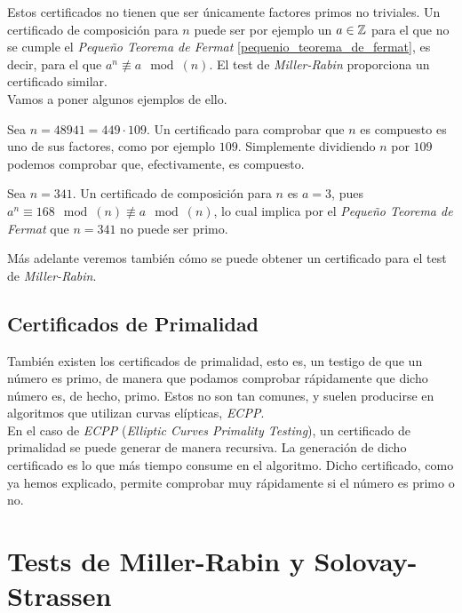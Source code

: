 Estos certificados no tienen que ser únicamente factores primos no triviales. Un certificado de composición para $n$ puede ser por ejemplo un $a \in \mathbb{Z}$ para el que no se cumple el \textit{Pequeño Teorema de Fermat} \ref{pequenio_teorema_de_fermat}, es decir, para el que $a^n \not\equiv a \mod(n)$. El test de \textit{Miller-Rabin} proporciona un certificado similar.\\

Vamos a poner algunos ejemplos de ello.

\begin{ejemplo}
	Sea $n = 48941 = 449\cdot109$. Un certificado para comprobar que $n$ es compuesto es uno de sus factores, como por ejemplo $109$. Simplemente dividiendo $n$ por $109$ podemos comprobar que, efectivamente, es compuesto.
\end{ejemplo}

\begin{ejemplo}
	Sea $n = 341$. Un certificado de composición para $n$ es $a = 3$, pues $a^n \equiv 168 \mod(n) \not\equiv a \mod(n)$, lo cual implica por el \textit{Pequeño Teorema de Fermat} que $n = 341$ no puede ser primo.
\end{ejemplo}

Más adelante veremos también cómo se puede obtener un certificado para el test de \textit{Miller-Rabin}.

\subsection{Certificados de Primalidad}

También existen los certificados de primalidad, esto es, un testigo de que un número es primo, de manera que podamos comprobar rápidamente que dicho número es, de hecho, primo. Estos no son tan comunes, y suelen producirse en algoritmos que utilizan curvas elípticas, \textit{ECPP}.\\

En el caso de \textit{ECPP} (\textit{Elliptic Curves Primality Testing}), un certificado de primalidad se puede generar de manera recursiva. La generación de dicho certificado es lo que más tiempo consume en el algoritmo. Dicho certificado, como ya hemos explicado, permite comprobar muy rápidamente si el número es primo o no.

\section{Tests de Miller-Rabin y Solovay-Strassen}

